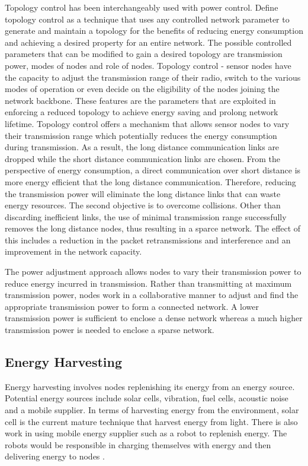 Topology control has been interchangeably used with power control. Define topology control as a technique that uses any controlled network parameter to generate and maintain a topology for the benefits of reducing energy consumption and achieving a desired property for an entire network. The possible controlled parameters that can be modified to gain a desired topology are transmission power, modes of nodes and role of nodes.
Topology control - sensor nodes have the capacity to adjust the transmission range of their radio, switch to the various modes of operation or even decide on the eligibility of the nodes joining the network backbone. These features are the parameters that are exploited in enforcing a reduced topology to achieve energy saving and prolong network lifetime. Topology control offers a mechanism that allows sensor nodes to vary their transmission range which potentially reduces the energy consumption during transmission. As a result, the long distance communication links are dropped while the short distance communication links are chosen. From the perspective of energy consumption, a direct communication over short distance is more energy efficient that the long distance communication. Therefore, reducing the transmission power will eliminate the long distance links that can waste energy resources. The second objective is to overcome collisions. Other than discarding inefficient links, the use of minimal transmission range successfully removes the long distance nodes, thus resulting in a sparce network. The effect of this includes a reduction in the packet retransmissions and interference and an improvement in the network capacity. \cite{azrinasurvey}

The power adjustment approach allows nodes to vary their transmission power to reduce energy incurred in transmission. Rather than transmitting at maximum transmission power, nodes work in a collaborative manner to adjust and find the appropriate transmission power to form a connected network. A lower transmission power is sufficient to enclose a dense network whereas a much higher transmission power is needed to enclose a sparse network.\cite{azrinasurvey}

\subsection{Energy Harvesting}
Energy harvesting involves nodes replenishing its energy from an energy source. Potential energy sources include solar cells, vibration, fuel cells, acoustic noise and a mobile supplier. In terms of harvesting energy from the environment, solar cell is the current mature technique that harvest energy from light. There is also work in using mobile energy supplier such as a robot to replenish energy. The robots would be responsible in charging themselves with energy and then delivering energy to nodes \cite{wsnSurvey1}.

